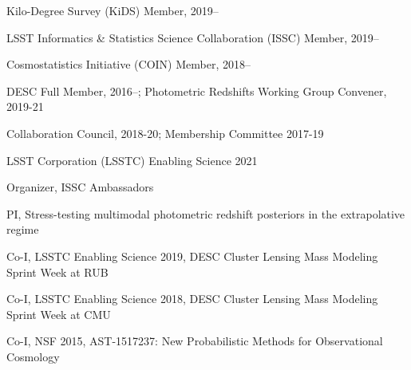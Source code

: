 \documentclass[11pt,letterpaper]{article}
\begin{document}
\begin{list}{}{\malzlist}
	\item Kilo-Degree Survey (KiDS) Member, 2019--
	\item LSST Informatics \& Statistics Science Collaboration (ISSC) Member, 2019--
	\item Cosmostatistics Initiative (COIN) Member, 2018--
	\item DESC Full Member, 2016--; Photometric Redshifts Working Group Convener, 2019-21
	\begin{list}{}{\malzlist}
		\item Collaboration Council, 2018-20; Membership Committee 2017-19
	\end{list}
\end{list}


% 


 \begin{list}{}{\malzlist}
 \item LSST Corporation (LSSTC) Enabling Science 2021
\begin{list}{}{\malzlist}
	\item Organizer, ISSC Ambassadors 
	\item PI, Stress-testing multimodal photometric redshift posteriors in the extrapolative regime
\end{list}
 \item Co-I, LSSTC Enabling Science 2019, DESC Cluster Lensing Mass Modeling Sprint Week at RUB
 \item Co-I, LSSTC Enabling Science 2018, DESC Cluster Lensing Mass Modeling Sprint Week at CMU
\item Co-I, NSF 2015, AST-1517237: New Probabilistic Methods for Observational Cosmology
\end{list}
\end{document}
